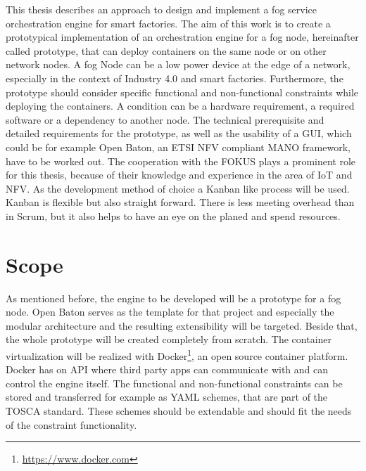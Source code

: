This thesis describes an approach to design and implement a fog service orchestration engine for smart factories.
The aim of this work is to create a prototypical implementation of an orchestration engine for a fog node, hereinafter called prototype, that can deploy containers on the same node or on other network nodes.
A fog Node can be a low power device at the edge of a network, especially in the context of Industry 4.0 and smart factories.
Furthermore, the prototype should consider specific functional and non-functional constraints while deploying the containers.
A condition can be a hardware requirement, a required software or a dependency to another node.
The technical prerequisite and detailed requirements for the prototype, as well as the usability of a \ac{GUI}, which could be for example Open Baton, an \ac{ETSI} \ac{NFV} compliant \ac{MANO} framework, have to be worked out.
The cooperation with the \acf{FOKUS} plays a prominent role for this thesis, because of their knowledge and experience in the area of \ac{IoT} and \ac{NFV}.
As the development method of choice a Kanban like process will be used.
Kanban is flexible but also straight forward.
There is less meeting overhead than in Scrum, but it also helps to have an eye on the planed and spend resources.


\section{Scope}


As mentioned before, the engine to be developed will be a prototype for a fog node.
Open Baton serves as the template for that project and especially the modular architecture and the resulting extensibility will be targeted.
Beside that, the whole prototype will be created completely from scratch.
The container virtualization will be realized with Docker\footnote{\url{https://www.docker.com}}, an open source container platform.
Docker has on \ac{API} where third party apps can communicate with and can control the engine itself.
The functional and non-functional constraints can be stored and transferred for example as \ac{YAML} schemes, that are part of the \ac{TOSCA} standard.
These schemes should be extendable and should fit the needs of the constraint functionality.

